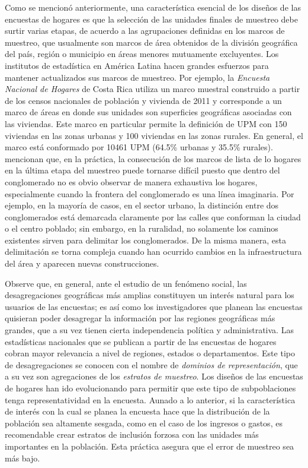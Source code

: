 \documentclass[
  10pt,
  spanish,
]{book}
\begin{document}
Como se mencionó anteriormente, una característica esencial de los diseños de las encuestas de hogares es que la selección de las unidades finales de muestreo debe surtir varias etapas, de acuerdo a las agrupaciones definidas en los marcos de muestreo, que usualmente son marcos de área obtenidos de la división geográfica del país, región o municipio en áreas menores mutuamente excluyentes. Los institutos de estadística en América Latina hacen grandes esfuerzos para mantener actualizados sus marcos de muestreo. Por ejemplo, la \emph{Encuesta Nacional de Hogares} de Costa Rica utiliza un marco muestral construido a partir de los censos nacionales de población y vivienda de 2011 y corresponde a un marco de áreas en donde sus unidades son superficies geográficas asociadas con las viviendas. Este marco en particular permite la definición de UPM con 150 viviendas en las zonas urbanas y 100 viviendas en las zonas rurales. En general, el marco está conformado por 10461 UPM (64.5\% urbanas y 35.5\% rurales). \citet{Gambino_Silva_2009} mencionan que, en la práctica, la consecución de los marcos de lista de lo hogares en la última etapa del muestreo puede tornarse difícil puesto que dentro del conglomerado no es obvio observar de manera exhaustiva los hogares, especialmente cuando la frontera del conglomerado es una línea imaginaria. Por ejemplo, en la mayoría de casos, en el sector urbano, la distinción entre dos conglomerados está demarcada claramente por las calles que conforman la ciudad o el centro poblado; sin embargo, en la ruralidad, no solamente los caminos existentes sirven para delimitar los conglomerados. De la misma manera, esta delimitación se torna compleja cuando han ocurrido cambios en la infraestructura del área y aparecen nuevas construcciones.

Observe que, en general, ante el estudio de un fenómeno social, las desagregaciones geográficas más amplias constituyen un interés natural para los usuarios de las encuestas; es así como los investigadores que planean las encuestas quisieran poder desagregar la información por las regiones geográficas más grandes, que a su vez tienen cierta independencia política y administrativa. Las estadísticas nacionales que se publican a partir de las encuestas de hogares cobran mayor relevancia a nivel de regiones, estados o departamentos. Este tipo de desagregaciones se conocen con el nombre de \emph{dominios de representación}, que a su vez son agregaciones de los \emph{estratos de muestreo}. Los diseños de las encuestas de hogares han ido evolucionando para permitir que este tipo de subpoblaciones tenga representatividad en la encuesta. Aunado a lo anterior, si la característica de interés con la cual se planea la encuesta hace que la distribución de la población sea altamente sesgada, como en el caso de los ingresos o gastos, es recomendable crear estratos de inclusión forzosa con las unidades más importantes en la población. Esta práctica asegura que el error de muestreo sea más bajo.
\end{document}
